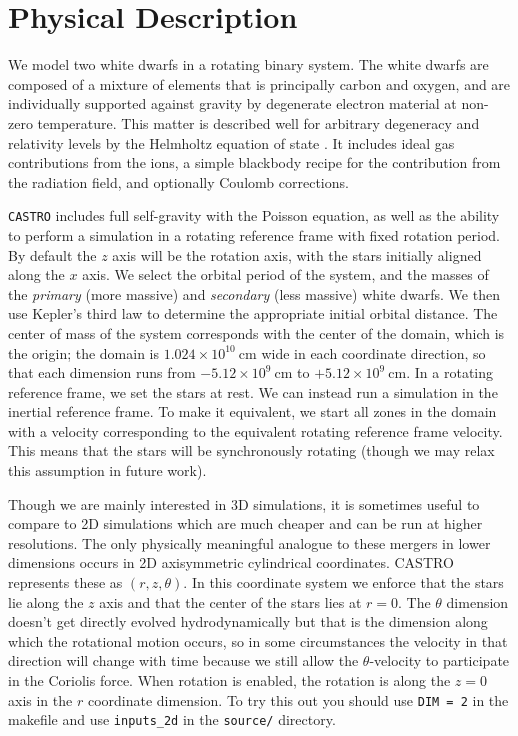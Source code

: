 \documentclass[12pt]{book}
\begin{document}
\section{Physical Description}

We model two white dwarfs in a rotating binary system. The white dwarfs are composed of 
a mixture of elements that is principally carbon and oxygen, and are individually supported 
against gravity by degenerate electron material at non-zero temperature. This matter is described well 
for arbitrary degeneracy and relativity levels by the Helmholtz equation of state \cite{timmes_swesty:2000}.
It includes ideal gas contributions from the ions, a simple blackbody recipe for the contribution from 
the radiation field, and optionally Coulomb corrections. 

\texttt{CASTRO} includes full self-gravity with the Poisson equation, as well as the ability to perform a
simulation in a rotating reference frame with fixed rotation period. By default the $z$ axis will 
be the rotation axis, with the stars initially aligned along the $x$ axis. We select the 
orbital period of the system, and the masses of the \textit{primary} (more massive) and 
\textit{secondary} (less massive) white dwarfs. We then use Kepler's third law to determine the 
appropriate initial orbital distance. The center of mass of the system corresponds with the center 
of the domain, which is the origin; the domain is $1.024 \times 10^{10}\ \text{cm}$ wide in each 
coordinate direction, so that each dimension runs from $-5.12 \times 10^{9}\ \text{cm}$ to 
$+5.12 \times 10^{9}\ \text{cm}$. In a rotating reference frame, we set the stars at rest. 
We can instead run a simulation in the inertial reference frame. To make it equivalent, we
start all zones in the domain with a velocity corresponding to the equivalent rotating 
reference frame velocity. This means that the stars will be synchronously rotating (though we
may relax this assumption in future work).

Though we are mainly interested in 3D simulations, it is sometimes useful to compare to 2D
simulations which are much cheaper and can be run at higher resolutions. The only physically
meaningful analogue to these mergers in lower dimensions occurs in 2D axisymmetric cylindrical
coordinates. CASTRO represents these as $(r,z,\theta)$. In this coordinate system we enforce
that the stars lie along the $z$ axis and that the center of the stars lies at $r = 0$. The
$\theta$ dimension doesn't get directly evolved hydrodynamically but that is the dimension
along which the rotational motion occurs, so in some circumstances the velocity in that
direction will change with time because we still allow the $\theta$-velocity to participate in
the Coriolis force. When rotation is enabled, the rotation is along the $z = 0$ axis in the $r$
coordinate dimension. To try this out you should use \texttt{DIM = 2} in the makefile and
use \texttt{inputs\_2d} in the \texttt{source/} directory.
\end{document}
